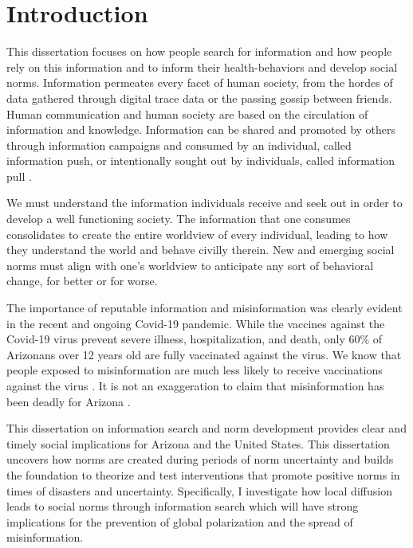 \hypertarget{intro}{%
\chapter{Introduction}\label{intro}}



This dissertation focuses on how people search for information and how people
rely on this information and to inform their health-behaviors and develop social
norms. Information permeates every facet of human society, from the hordes of
data gathered through digital trace data or the passing gossip between friends.
Human communication and human society are based on the circulation of
information and knowledge. Information can be shared and promoted by others
through information campaigns and consumed by an individual, called information
push, or intentionally sought out by individuals, called information pull
\citep{cybenkoFoundationsInformationPush1999}.

We must understand the information individuals receive and seek out in order
to develop a well functioning society. The information that
one consumes consolidates to create the entire worldview of every individual,
leading to how they understand the world and behave civilly therein. New and
emerging social norms must align with one's worldview to anticipate any sort of 
behavioral change, for better or for worse. 

The importance of reputable information and misinformation was clearly evident
in the recent and ongoing Covid-19 pandemic. While the vaccines against the
Covid-19 virus prevent severe illness, hospitalization, and death, only 60\% of
Arizonans over 12 years old are fully vaccinated against the virus. We know that
people exposed to misinformation are much less likely to receive vaccinations
against the virus \citep{loombaMeasuringImpactCOVID192021}. It is not an
exaggeration to claim that misinformation has been deadly for Arizona
\citep{pathakInfodemicsCOVID19Role2020, greene_murphy21}.

This dissertation on information search and norm development provides clear and
timely social implications for Arizona and the United States. This dissertation
uncovers how norms are created during periods of norm uncertainty and builds the
foundation to theorize and test interventions that promote positive norms in
times of disasters and uncertainty. Specifically, I investigate how local
diffusion leads to social norms through information search which will have
strong implications for the prevention of global polarization and the spread of
misinformation.

